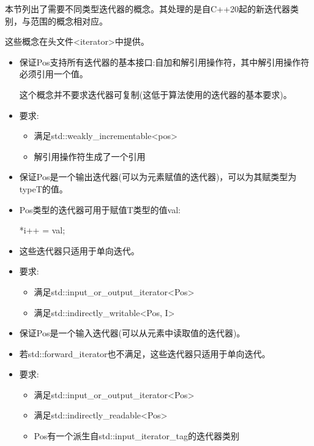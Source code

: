 
本节列出了需要不同类型迭代器的概念。其处理的是自C++20起的新迭代器类别，与范围的概念相对应。

这些概念在头文件<iterator>中提供。


\begin{itemize}
\item
保证Pos支持所有迭代器的基本接口:自加和解引用操作符，其中解引用操作符必须引用一个值。

这个概念并不要求迭代器可复制(这低于算法使用的迭代器的基本要求)。

\item
要求:
\begin{itemize}
\item
满足std::weakly\_incrementable<pos>

\item
解引用操作符生成了一个引用
\end{itemize}
\end{itemize}


\begin{itemize}
\item
保证Pos是一个输出迭代器(可以为元素赋值的迭代器)，可以为其赋类型为typeT的值。

\item
Pos类型的迭代器可用于赋值T类型的值val:

\begin{cpp}
*i++ = val;
\end{cpp}

\item
这些迭代器只适用于单向迭代。

\item
要求:
\begin{itemize}
\item
满足std::input\_or\_output\_iterator<Pos>

\item
满足std::indirectly\_writable<Pos, I>
\end{itemize}
\end{itemize}


\begin{itemize}
\item
保证Pos是一个输入迭代器(可以从元素中读取值的迭代器)。

\item
若std::forward\_iterator也不满足，这些迭代器只适用于单向迭代。

\item
要求:
\begin{itemize}
\item
满足std::input\_or\_output\_iterator<Pos>

\item
满足std::indirectly\_readable<Pos>

\item
Pos有一个派生自std::input\_iterator\_tag的迭代器类别
\end{itemize}
\end{itemize}


